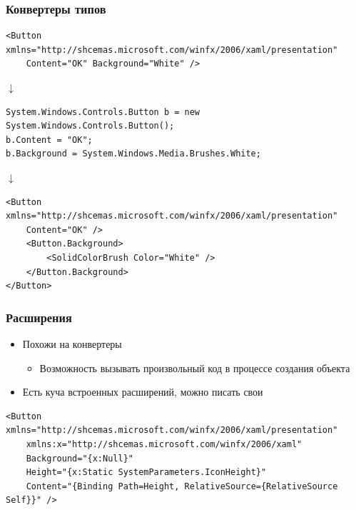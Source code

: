 \documentclass[xetex,mathserif,serif]{beamer}
\newcommand{\DownArrow} {
	\hspace{2cm}\begin{LARGE}$\downarrow$\end{LARGE}
}
\begin{document}
	\begin{frame}[fragile]
		\frametitle{Конвертеры типов}
		\begin{footnotesize}
			\begin{verbatim}
<Button xmlns="http://shcemas.microsoft.com/winfx/2006/xaml/presentation"
    Content="OK" Background="White" />
			\end{verbatim}
		\end{footnotesize}

		\DownArrow
		\begin{footnotesize}
			\begin{verbatim}
System.Windows.Controls.Button b = new System.Windows.Controls.Button();
b.Content = "OK";
b.Background = System.Windows.Media.Brushes.White;
			\end{verbatim}
		\end{footnotesize}

		\DownArrow
		\begin{footnotesize}
			\begin{verbatim}
<Button xmlns="http://shcemas.microsoft.com/winfx/2006/xaml/presentation"
    Content="OK" />
    <Button.Background>
        <SolidColorBrush Color="White" />
    </Button.Background>
</Button>
			\end{verbatim}
		\end{footnotesize}
	\end{frame}

	\begin{frame}[fragile]
		\frametitle{Расширения}
		\begin{itemize}
			\item Похожи на конвертеры
			\begin{itemize}
				\item Возможность вызывать произвольный код в процессе создания объекта
			\end{itemize}
			\item Есть куча встроенных расширений, можно писать свои
		\end{itemize}
		\begin{footnotesize}
			\begin{verbatim}
<Button xmlns="http://shcemas.microsoft.com/winfx/2006/xaml/presentation"
    xmlns:x="http://shcemas.microsoft.com/winfx/2006/xaml"
    Background="{x:Null}"
    Height="{x:Static SystemParameters.IconHeight}"
    Content="{Binding Path=Height, RelativeSource={RelativeSource Self}}" />
			\end{verbatim}
		\end{footnotesize}
	\end{frame}
\end{document}
